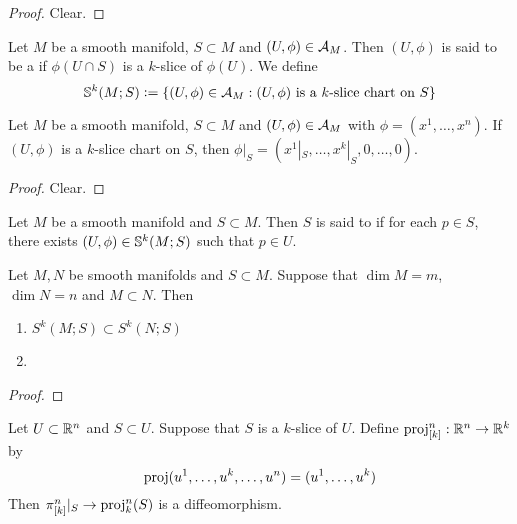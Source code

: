 \documentclass{book}
\begin{document}
	\begin{ex}
	\end{ex}

	\begin{proof}
		Clear.
	\end{proof}
	
	\begin{defn}
	Let $M$ be a smooth manifold, $S \subset M$ and $(U, \phi) \in \MA_M$. Then $(U, \phi)$ is said to be a  if $\phi(U \cap S)$ is a $k$-slice of $\phi(U)$. We define
	$$\S^k(M; S) \defeq \{(U, \phi) \in \MA_M: \text{$(U, \phi)$ is a $k$-slice chart on $S$}\}$$
	\end{defn}	
	
	\begin{ex}
	Let $M$ be a smooth manifold, $S \subset M$ and $(U, \phi) \in \MA_M$ with $\phi = (x^1, \dots, x^n)$. If $(U, \phi)$ is a $k$-slice chart on $S$, then $\phi|_S = (x^1|_S, \dots, x^k|_S, 0, \dots, 0)$.
	\end{ex}
	
	\begin{proof}
	Clear. 
	\end{proof}
	
	\begin{defn}
	Let $M$ be a smooth manifold and $S \subset M$. Then $S$ is said to  if for each $p \in S$, there exists $(U, \phi) \in \S^k(M; S)$ such that $p \in U$. 
	\end{defn}

	\begin{ex}
		Let $M, N$ be smooth manifolds and $S \subset M$. Suppose that $\dim M = m$, $\dim N = n$ and $M \subset N$. Then  
		\begin{enumerate}
			\item $S^{k}(M;S) \subset S^k(N;S)$
			\item 
		\end{enumerate}
	\end{ex}

	\begin{proof}
		\tcr{FINISH!!!}
	\end{proof}

	\begin{ex}
		Let $U \subset \R^n$ and $S \subset U$. Suppose that $S$ is a $k$-slice of $U$. Define $\prj^n_{[k]}: \R^n \rightarrow \R^k$ by $$\prj(u^1, \dots, u^k, \dots, u^n) = (u^1, \dots, u^k)$$ Then $\pi^n_{[k]}|_{S} \rightarrow \prj^n_{k}(S)$ is a diffeomorphism.
	\end{ex}	
	
\end{document}
